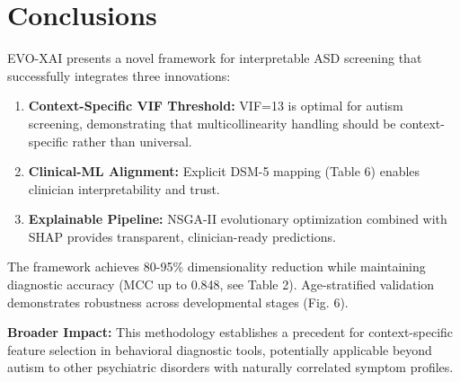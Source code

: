 \section{Conclusions}\label{conclusions}

EVO-XAI presents a novel framework for interpretable ASD screening that successfully integrates three innovations:

\begin{enumerate}
\def\labelenumi{\arabic{enumi}.}
\item
  \textbf{Context-Specific VIF Threshold:} VIF=13 is optimal for autism screening, demonstrating that multicollinearity handling should be context-specific rather than universal.
\item
  \textbf{Clinical-ML Alignment:} Explicit DSM-5 mapping (Table 6) enables clinician interpretability and trust.
\item
  \textbf{Explainable Pipeline:} NSGA-II evolutionary optimization combined with SHAP provides transparent, clinician-ready predictions.
\end{enumerate}

The framework achieves 80-95\% dimensionality reduction while maintaining diagnostic accuracy (MCC up to 0.848, see Table 2). Age-stratified validation demonstrates robustness across developmental stages (Fig. 6).

\textbf{Broader Impact:} This methodology establishes a precedent for context-specific feature selection in behavioral diagnostic tools, potentially applicable beyond autism to other psychiatric disorders with naturally correlated symptom profiles.

